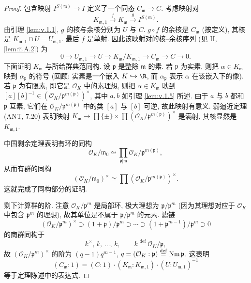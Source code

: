 \begin{proof}
包含映射 $I^{S(\mathfrak{m})}\to I$ 定义了一个同态 $C_{\mathfrak{m}}\to C$. 考虑映射对
\[
K_{\mathfrak{m},1}\xrightarrow{\ f\ }K_{\mathfrak{m}}\xrightarrow{\ g\ }I^{S(\mathfrak{m})}.
\]
由引理 \ref{lem:v.1.1}, $g$ 的核与余核分别为 $U$ 与 $C$. $g\circ f$ 的余核是 $C_{\mathfrak{m}}$ (按定义), 其核是 $K_{\mathfrak{m},1}\cap U=U_{\mathfrak{m},1}$. 最后 $f$ 是单射. 因此该映射对的核--余核序列 (见 II, \ref{lem:ii.A.2}) 为
\[
0\to U_{\mathfrak{m},1}\to U\to K_{\mathfrak{m}}/K_{\mathfrak{m},1}\to C_{\mathfrak{m}}\to C\to0.
\]
下面证明 $K_{\mathfrak{m}}$ 与所给群典范同构. 设 $\mathfrak{p}$ 是整除 $\mathfrak{m}$ 的素. 若 $\mathfrak{p}$ 为实素, 则把 $\alpha\in K_{\mathfrak{m}}$ 映到 $\alpha_{\mathfrak{p}}$ 的符号 (回顾: 实素是一个嵌入 $K\hookrightarrow\R$, 而 $\alpha_{\mathfrak{p}}$ 表示 $\alpha$ 在该嵌入下的像). 若 $\mathfrak{p}$ 为有限素, 即它是 $\mathcal{O}_K$ 中的素理想, 则把 $\alpha\in K_{\mathfrak{m}}$ 映到 $[a][b]^{-1}\in(\mathcal{O}_K/\mathfrak{p}^{m(\mathfrak{p})})^{\times}$, 其中 $a,b$ 如引理 \ref{lem:v.1.5} 所述. 由于 $a$ 与 $b$ 都和 $\mathfrak{p}$ 互素, 它们在 $\mathcal{O}_K/\mathfrak{p}^{m(\mathfrak{p})}$ 中的类 $[a]$ 与 $[b]$ 可逆, 故此映射有意义. 弱逼近定理 (ANT, 7.20) 表明映射 $K_{\mathfrak{m}}\to\prod\{\pm\}\times\prod(\mathcal{O}_K/\mathfrak{p}^{m(\mathfrak{p})})^{\times}$ 是满射, 其核显然是 $K_{\mathfrak{m},1}$.

中国剩余定理表明有环的同构
\[
\mathcal{O}_K/\mathfrak{m}_0\simeq\prod_{\mathfrak{p}|\mathfrak{m}}\mathcal{O}_K/\mathfrak{p}^{m(\mathfrak{p})},
\]
从而有群的同构
\[
(\mathcal{O}_K/\mathfrak{m}_0)^{\times}\simeq\prod(\mathcal{O}_K/\mathfrak{p}^{m(\mathfrak{p})})^{\times}.
\]
这就完成了同构部分的证明.

剩下计算群的阶. 注意 $\mathcal{O}_K/\mathfrak{p}^m$ 是局部环, 极大理想为 $\mathfrak{p}/\mathfrak{p}^m$ (因为其理想对应于 $\mathcal{O}_K$ 中包含 $\mathfrak{p}^m$ 的理想), 故其单位是不属于 $\mathfrak{p}/\mathfrak{p}^m$ 的元素. 滤链
\[
(\mathcal{O}_K/\mathfrak{p}^m)^{\times}\supset(1+\mathfrak{p})/\mathfrak{p}^m\supset\cdots\supset(1+\mathfrak{p}^{m-1})/\mathfrak{p}^m\supset 0
\]
的商群同构于
\[
k^{\times},\,k,\,\ldots,\,k,\qquad k\overset{\mathrm{def}}{=}\mathcal{O}_K/\mathfrak{p},
\]
故 $(\mathcal{O}_K/\mathfrak{p}^m)^{\times}$ 的阶为 $(q-1)q^{m-1}$, $q=(\mathcal{O}_K:\mathfrak{p})\overset{\mathrm{def}}{=}\operatorname{Nm}\mathfrak{p}$. 这表明
\[
(C_{\mathfrak{m}}:1)=(C:1)\cdot(K_{\mathfrak{m}}:K_{\mathfrak{m},1})\cdot(U:U_{\mathfrak{m},1})^{-1}
\]
等于定理陈述中的表达式.
\end{proof}

